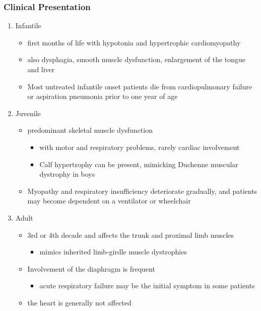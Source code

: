 \documentclass{scrartcl}
\begin{document}
\subsubsection{Clinical Presentation}
\label{sec:org7d5f8df}
\begin{enumerate}
\item Infantile
\label{sec:orgcae81be}
\begin{itemize}
\item first months of life with hypotonia and hypertrophic cardiomyopathy
\item also dysphagia, smooth muscle dysfunction, enlargement of the tongue
and liver
\item Most untreated infantile onset patients die from cardiopulmonary
failure or aspiration pneumonia prior to one year of age
\end{itemize}
\item Juvenile
\label{sec:org611abf2}
\begin{itemize}
\item predominant skeletal muscle dysfunction
\begin{itemize}
\item with motor and respiratory problems, rarely cardiac involvement
\item Calf hypertrophy can be present, mimicking Duchenne muscular dystrophy in boys
\end{itemize}
\item Myopathy and respiratory insufficiency deteriorate gradually, and patients may become dependent on a ventilator or wheelchair
\end{itemize}
\item Adult
\label{sec:orgb4227f7}
\begin{itemize}
\item 3rd or 4th decade and affects the trunk and proximal limb muscles
\begin{itemize}
\item mimics inherited limb-girdle muscle dystrophies
\end{itemize}
\item Involvement of the diaphragm is frequent
\begin{itemize}
\item acute respiratory failure may be the initial symptom in some patients
\end{itemize}
\item the heart is generally not affected
\end{itemize}
\end{enumerate}
\end{document}
